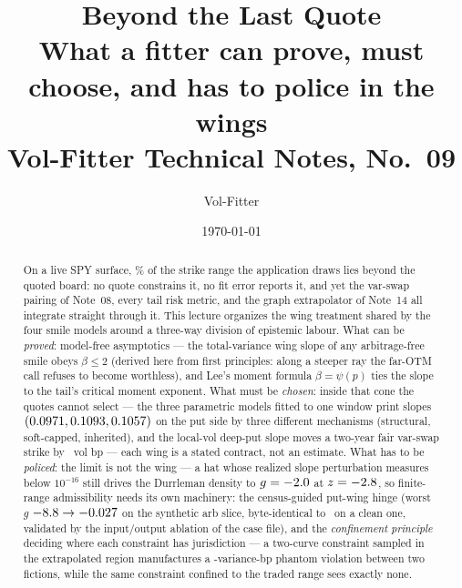 \documentclass[11pt]{article}
\title{\textbf{Beyond the Last Quote}\\[2pt]
\large What a fitter can prove, must choose, and has to police in the
wings\\[2pt]
\normalsize Vol-Fitter Technical Notes, No.~09}
\author{Vol-Fitter}
\date{\today}
\begin{document}
\maketitle



\begin{abstract}
On a live SPY surface, \wlqheroextrapshare\% of the strike range the
application draws lies beyond the quoted board: no quote constrains it,
no fit error reports it, and yet the var-swap pairing of Note~08, every
tail risk metric, and the graph extrapolator of Note~14 all integrate
straight through it.  This lecture organizes the wing treatment shared by
the four smile models around a three-way division of epistemic labour.
What can be \emph{proved}: model-free asymptotics --- the total-variance
wing slope of any arbitrage-free smile obeys $\beta\le2$ (derived here
from first principles: along a steeper ray the far-OTM call refuses to
become worthless), and Lee's moment formula $\beta=\psi(p)$ ties the
slope to the tail's critical moment exponent.  What must be \emph{chosen}:
inside that cone the quotes cannot select --- the three parametric models
fitted to one window print slopes $(0.0971,0.1093,
0.1057)$ on the put side by three different mechanisms (structural,
soft-capped, inherited), and the local-vol deep-put slope moves a
two-year fair var-swap strike by \wlqlvswingbp\ vol bp --- each wing is a
stated contract, not an estimate.  What has to be \emph{policed}: the
limit is not the wing --- a hat whose realized slope perturbation
measures below $10^{-16}$ still drives the Durrleman density to
$g=-2.0$ at $z=-2.8$, so finite-range admissibility needs
its own machinery: the census-guided put-wing hinge (worst $g$
$-8.8\to-0.027$ on the synthetic arb slice, byte-identical
to \wlqbyteid\ on a clean one, validated by the input/output ablation of
the case file), and the \emph{confinement principle} deciding where each
constraint has jurisdiction --- a two-curve constraint sampled in the
extrapolated region manufactures a \wlqphantomwide-variance-bp phantom
violation between two fictions, while the same constraint confined to
the traded range sees exactly none.
\end{abstract}

\newpage
\tableofcontents
\newpage
\end{document}

